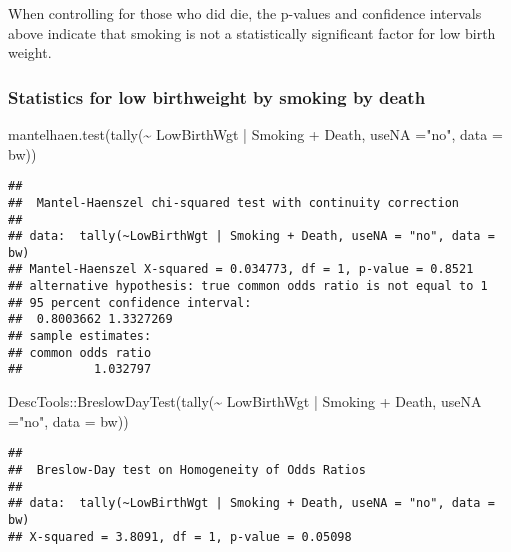 \documentclass[
]{article}
\newenvironment{Shaded}{\begin{snugshade}}{\end{snugshade}}
\newcommand{\AttributeTok}[1]{\textcolor[rgb]{0.77,0.63,0.00}{#1}}
\newcommand{\FunctionTok}[1]{\textcolor[rgb]{0.00,0.00,0.00}{#1}}
\newcommand{\NormalTok}[1]{#1}
\newcommand{\SpecialCharTok}[1]{\textcolor[rgb]{0.00,0.00,0.00}{#1}}
\newcommand{\StringTok}[1]{\textcolor[rgb]{0.31,0.60,0.02}{#1}}
\begin{document}
When controlling for those who did die, the p-values and confidence
intervals above indicate that smoking is not a statistically significant
factor for low birth weight.

\hypertarget{statistics-for-low-birthweight-by-smoking-by-death}{%
\subsubsection{Statistics for low birthweight by smoking by
death}\label{statistics-for-low-birthweight-by-smoking-by-death}}

\begin{Shaded}
\begin{Highlighting}[]
\FunctionTok{mantelhaen.test}\NormalTok{(}\FunctionTok{tally}\NormalTok{(}\SpecialCharTok{\textasciitilde{}}\NormalTok{ LowBirthWgt }\SpecialCharTok{|}\NormalTok{ Smoking }\SpecialCharTok{+}\NormalTok{ Death, }\AttributeTok{useNA =}\StringTok{"no"}\NormalTok{, }\AttributeTok{data =}\NormalTok{ bw))}
\end{Highlighting}
\end{Shaded}

\begin{verbatim}
## 
##  Mantel-Haenszel chi-squared test with continuity correction
## 
## data:  tally(~LowBirthWgt | Smoking + Death, useNA = "no", data = bw)
## Mantel-Haenszel X-squared = 0.034773, df = 1, p-value = 0.8521
## alternative hypothesis: true common odds ratio is not equal to 1
## 95 percent confidence interval:
##  0.8003662 1.3327269
## sample estimates:
## common odds ratio 
##          1.032797
\end{verbatim}

\begin{Shaded}
\begin{Highlighting}[]
\NormalTok{DescTools}\SpecialCharTok{::}\FunctionTok{BreslowDayTest}\NormalTok{(}\FunctionTok{tally}\NormalTok{(}\SpecialCharTok{\textasciitilde{}}\NormalTok{ LowBirthWgt }\SpecialCharTok{|}\NormalTok{ Smoking }\SpecialCharTok{+}\NormalTok{ Death, }\AttributeTok{useNA =}\StringTok{"no"}\NormalTok{, }\AttributeTok{data =}\NormalTok{ bw))}
\end{Highlighting}
\end{Shaded}

\begin{verbatim}
## 
##  Breslow-Day test on Homogeneity of Odds Ratios
## 
## data:  tally(~LowBirthWgt | Smoking + Death, useNA = "no", data = bw)
## X-squared = 3.8091, df = 1, p-value = 0.05098
\end{verbatim}
\end{document}
